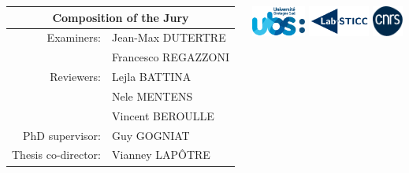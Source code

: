 \begin{frame}
    \begin{columns}
        \begin{column}{.4\linewidth}
            \centering \scriptsize
            \begin{tabular}{@{}rl@{}}
                \multicolumn{2}{c}{\textbf{Composition of the Jury}} \\ \midrule
                Examiners:          & Jean-Max DUTERTRE          \\
                                    & Francesco REGAZZONI        \\
                Reviewers:          & Lejla BATTINA              \\
                                    & Nele MENTENS               \\
                                    & Vincent BEROULLE           \\
                PhD supervisor:     & Guy GOGNIAT                \\
                Thesis co-director: & Vianney LAPÔTRE            %
            \end{tabular}
        \end{column}
        \begin{column}{.6\linewidth}
            \includegraphics[height=1cm]{img/logo/ubs.png}
            \hspace{1cm}
            \includegraphics[height=1cm]{img/logo/labsticc.pdf}
            \hspace{1cm}
            \includegraphics[height=1cm]{img/logo/cnrs.pdf}
        \end{column}
    \end{columns}
\end{frame}
